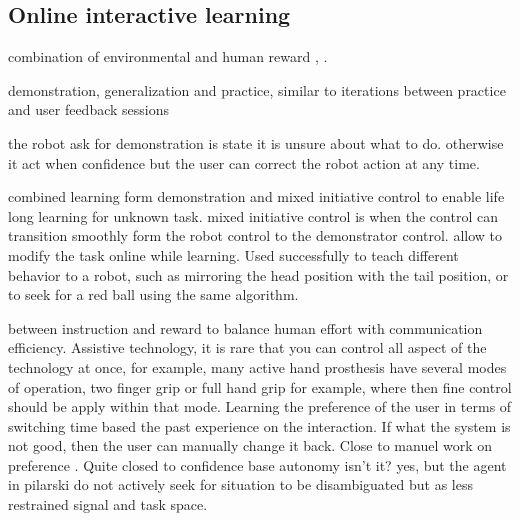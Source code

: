 



\subsection{Online interactive learning}



combination of environmental and human reward \cite{knox2010combining}, \cite{griffith2013policy}. 

\cite{nicolescu2003natural} demonstration, generalization and practice, similar to iterations between practice and user feedback sessions \cite{judah2010reinforcement}

\cite{chernova09jair} the robot ask for demonstration is state it is unsure about what to do. otherwise it act when confidence but the user can correct the robot action at any time.


\cite{grollman2007dogged} combined learning form demonstration and mixed initiative control to enable life long learning for unknown task. mixed initiative control is when the control can transition smoothly form the robot control to the demonstrator control. allow to modify the task online while learning. Used successfully to teach different behavior to a robot, such as mirroring the head position with the tail position, or to seek for a red ball using the same algorithm.

\cite{pilarski2012between} between instruction and reward to balance human effort with communication efficiency. Assistive technology, it is rare that you can control all aspect of the technology at once, for example, many active hand prosthesis have several modes of operation, two finger grip or full hand grip for example, where then fine control should be apply within that mode. Learning the preference of the user in terms of switching time based the past experience on the interaction. If what the system is not good, then the user can manually change it back. Close to manuel work on preference \cite{Mason2011}. Quite closed to confidence base autonomy isn't it? \cite{chernova09jair} yes, but the agent in pilarski do not actively seek for situation to be disambiguated but as less restrained signal and task space.

